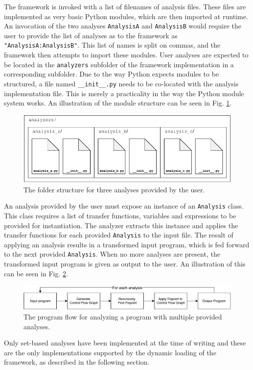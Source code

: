 \newpar The framework is invoked with a list of filenames of analysis files. These files are implemented as very basic Python modules, which are then imported at runtime. An invocation of the two analyses \texttt{AnalysisA} and \texttt{AnalysisB} would require the user to provide the list of analyses as to the framework as \texttt{"AnalysisA:AnalysisB"}. This list of names is split on commas, and the framework then attempts to import these modules. 
User analyses are expected to be located in the \texttt{analyzers} subfolder of the framework implementation in a corresponding subfolder. Due to the way Python expects modules to be structured, a file named \texttt{\_\_init\_\_.py} needs to be co-located with the analysis implementation file. This is merely a practicality in the way the Python module system works. An illustration of the module structure can be seen in Fig. \ref{fig:modulestructure}.

\begin{figure}[H]
    \centering
    \includegraphics{implementation/figures/folderstructure}
    \caption{The folder structure for three analyses provided by the user.}
    \label{fig:modulestructure}
\end{figure}

\newpar An analysis provided by the user must expose an instance of an \texttt{Analysis} class. This class requires a list of transfer functions, variables and expressions to be provided for instantiation. The analyzer extracts this instance and applies the transfer functions for each provided \texttt{Analysis} to the input file. The result of applying an analysis results in a transformed input program, which is fed forward to the next provided \texttt{Analysis}. When no more analyses are present, the transformed input program is given as output to the user. An illustration of this can be seen in Fig. \ref{fig:programflow}.

\begin{figure}[H]
    \centering
    \includegraphics[width=\textwidth]{implementation/figures/programflow}
    \caption{The program flow for analyzing a program with multiple provided analyses.}
    \label{fig:programflow}
\end{figure}

\newpar Only set-based analyses have been implemented at the time of writing and these are the only implementations supported by the dynamic loading of the framework, as described in the following section.